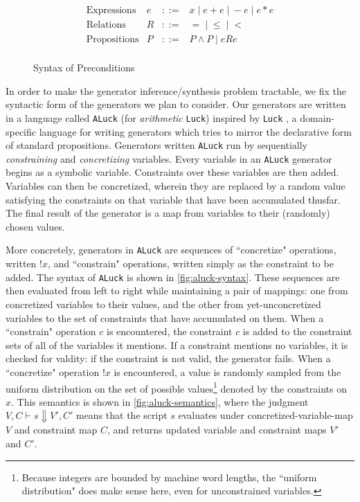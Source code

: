 \documentclass[sigconf,nonacm]{acmart}
\begin{document}
\begin{figure}
\caption{Syntax of Preconditions}
\label{fig:precond-syntax}
$$
\begin{array}{llll}
\text{Expressions} & e & ::= & x \; | \; e + e \; | \; -e \;|\; e*e\\
\text{Relations} & R & ::= & = \;|\; \leq \;|\; <\\
\text{Propositions} & P & ::= & P \wedge P \;|\; e R e\\
\end{array}
$$
\end{figure}

In order to make the generator inference/synthesis problem tractable, we fix the
syntactic form of the generators we plan to consider. Our generators are written
in a language called \texttt{ALuck} (for \textit{arithmetic} \texttt{Luck})
inspired by \texttt{Luck} \cite{luck}, a domain-specific language for writing
generators which tries to mirror the declarative form of standard propositions.
Generators written \texttt{ALuck} run by sequentially \textit{constraining} and
\textit{concretizing} variables. Every variable in an \texttt{ALuck} generator
begins as a symbolic variable. Constraints over these variables are then added.
Variables can then be concretized, wherein they are replaced by a random value
satisfying the constraints on that variable that have been accumulated thusfar.
The final result of the generator is a map from variables to their (randomly)
chosen values.

More concretely, generators in \texttt{ALuck} are sequences of ``concretize"
operations, written $!x$, and ``constrain" operations, written simply as the
constraint to be added. The syntax of \texttt{ALuck} is shown in
\autoref{fig:aluck-syntax}. These sequences are then evaluated from left to
right while maintaining a pair of mappings: one from concretized variables to
their values, and the other from yet-unconcretized variables to the set of
constraints that have accumulated on them.  When a ``constrain" operation $c$ is
encountered, the constraint $c$ is added to the constraint sets of all of the
variables it mentions. If a constraint mentions no variables, it is checked for
valdity: if the constraint is not valid, the generator fails. When a
``concretize" operation $!x$ is encountered, a value is randomly sampled from
the uniform distribution on the set of possible values\footnote{ Because
integers are bounded by machine word lengths, the ``uniform distribution" does
make sense here, even for unconstrained variables.  } denoted by the constraints
on $x$. This semantics is shown in \autoref{fig:aluck-semantics}, where the
judgment $V,C \vdash s \Downarrow V',C'$ means that the script $s$ evaluates
under concretized-variable-map $V$ and constraint map $C$, and returns updated
variable and constraint maps $V'$ and $C'$.
\end{document}
